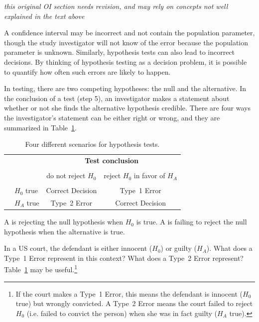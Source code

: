 \begin{spacing}{1.5}
\textit{this original OI section needs revision, and may rely on concepts not well explained in the text above}

A confidence interval may be incorrect and not contain the population parameter, though the study investigator will not know of the error because the population parameter is unknown.  Similarly, hypothesis tests can also lead to incorrect decisions.  By thinking of hypothesis testing as a decision problem, it is possible to quantify how often such errors are likely to  happen.

In testing, there are two competing hypotheses: the null and the alternative. In the conclusion of a test (step 5), an investigator makes a statement about whether or not she finds the alternative hypothesis credible. There are four ways the investigator's statement can be either right or wrong, and they are summarized in Table~\ref{fourHTScenarios}.

\begin{table}[ht]
\centering
\begin{tabular}{l l c c}
& & \multicolumn{2}{c}{\textbf{Test conclusion}} \\
  \cline{3-4}
\vspace{-3.7mm} \\
& & do not reject $H_0$ &  reject $H_0$ in favor of $H_A$ \\
  \cline{2-4}
\vspace{-3.7mm} \\
& $H_0$ true & Correct Decision &  Type~1 Error \\
\raisebox{1.5ex}{\textbf{Truth}} & $H_A$ true & Type~2 Error & Correct Decision\\
  \cline{2-4}
\end{tabular}
\caption{Four different scenarios for hypothesis tests.}
\label{fourHTScenarios}
\end{table}

A  is rejecting the null hypothesis when $H_0$ is true. A  is failing to reject the null hypothesis when the alternative is true.

\begin{exercise} \label{whatAreTheErrorTypesInUSCourts}
In a US court, the defendant is either innocent ($H_0$) or  guilty ($H_A$). What does a Type~1 Error represent in this context? What does a Type~2 Error represent? Table~\ref{fourHTScenarios} may be useful.\footnote{If the court makes a Type~1 Error, this means the defendant is innocent ($H_0$ true) but wrongly convicted. A Type~2 Error means the court failed to reject $H_0$ (i.e. failed to convict the person) when she was in fact guilty ($H_A$ true).}
\end{exercise}


\end{spacing}
